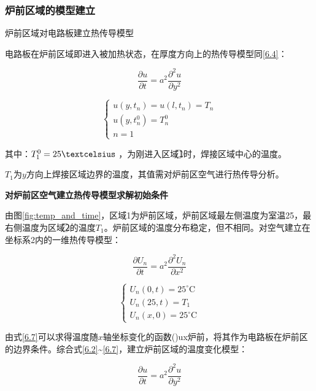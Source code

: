 \documentclass[withoutpreface,bwprint]{cumcmthesis} %
\numberwithin{equation}{subsection}
\begin{document}
\subsubsection{炉前区域的模型建立}

\noindent 炉前区域对电路板建立热传导模型

电路板在炉前区域即进入被加热状态，在厚度方向上的热传导模型同\eqref{6.4}：

$$\frac{\partial u}{\partial t}= a^2\frac{\partial^2 u}{\partial y^2}$$

\begin{equation}
	\left\{ \begin{array}{l}
		u\left(y,t_{n} \right) =u\left(l,t_{n} \right)=T_{n}\\
		u\left(y,t_{n}^0 \right) =T_{n}^0\\
		n=1
	\end{array}\right.
	\label{6.5}
\end{equation}

\noindent 其中：$T_{1}^0=25\textcelsius$ ，为刚进入区域\textcircled{1}时，焊接区域中心的温度。

$T_{1}$为$y$方向上焊接区域边界的温度，其值需对炉前区空气进行热传导分析。

\noindent \textbf{对炉前区空气建立热传导模型求解初始条件}

由图\ref{fig:temp_and_time}，区域1为炉前区域，炉前区域最左侧温度为室温25\textcelsius，最右侧温度为区域\textcircled{2}的温度$T_{1}$。炉前区域的温度分布稳定，但不相同。对空气建立在坐标系2内的一维热传导模型：

\begin{equation}
	\frac{\partial U_{n}}{\partial t}=a^{2} \frac{\partial^{2} U_{n}}{\partial x^{2}}
	\label{6.6}
\end{equation}

\begin{equation}
	\left\{\begin{array}{l}
	U_{n}(0, t)=25^{\circ} \mathrm{C} \\
	U_{n}(25, t)=T_{1} \\
	U_{n}(x, 0)=25^{\circ} \mathrm{C}
	\end{array}\right.
	\label{6.7}
\end{equation}

由式\eqref{6.7}可以求得温度随$𝑥$轴坐标变化的函数()ux炉前，将其作为电路板在炉前区的边界条件。综合式\eqref{6.2}\~{}\eqref{6.7}，建立炉前区域的温度变化模型：

$$
\frac{\partial u}{\partial t}=a^{2} \frac{\partial^{2} u}{\partial y^{2}}
$$
\end{document}
